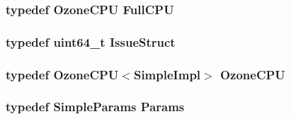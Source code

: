 \label{structSimpleImpl_a97cfe75c4e2ec15e611a76b57827e045}
\hypertarget{structSimpleImpl_a3b44bd64928743998e6879a07520b3b7}{
\subsubsection[{FullCPU}]{\setlength{\rightskip}{0pt plus 5cm}typedef {\bf OzoneCPU} {\bf FullCPU}}}
\label{structSimpleImpl_a3b44bd64928743998e6879a07520b3b7}
\hypertarget{structSimpleImpl_ad906a02b6e2b621a30df354fa780da6f}{
\subsubsection[{IssueStruct}]{\setlength{\rightskip}{0pt plus 5cm}typedef uint64\_\-t {\bf IssueStruct}}}
\label{structSimpleImpl_ad906a02b6e2b621a30df354fa780da6f}
\hypertarget{structSimpleImpl_a508935a6f5fec404726fbffb104f059a}{
\subsubsection[{OzoneCPU}]{\setlength{\rightskip}{0pt plus 5cm}typedef {\bf OzoneCPU}$<${\bf SimpleImpl}$>$ {\bf OzoneCPU}}}
\label{structSimpleImpl_a508935a6f5fec404726fbffb104f059a}
\hypertarget{structSimpleImpl_a97a13164dd1bc9c081a6c711e68e6160}{
\subsubsection[{Params}]{\setlength{\rightskip}{0pt plus 5cm}typedef {\bf SimpleParams} {\bf Params}}}
\label{structSimpleImpl_a97a13164dd1bc9c081a6c711e68e6160}


